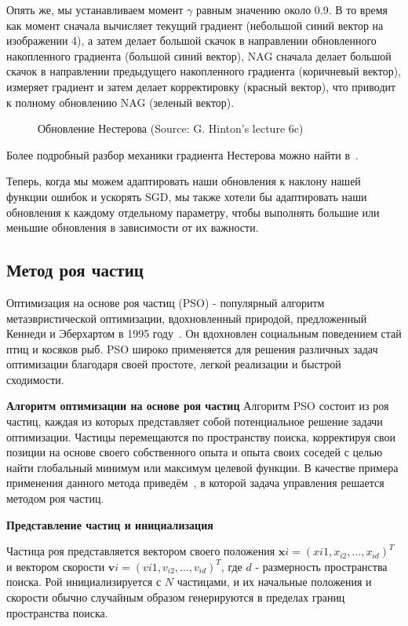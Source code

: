 Опять же, мы устанавливаем момент $\gamma$ равным значению около 0.9.
В то время как момент сначала вычисляет текущий
градиент (небольшой синий вектор на изображении 4),
а затем делает большой скачок в направлении обновленного
накопленного градиента (большой синий вектор), NAG сначала делает
большой скачок в направлении предыдущего накопленного градиента
(коричневый вектор), измеряет градиент и затем делает корректировку
(красный вектор), что приводит к полному обновлению NAG (зеленый вектор).
\begin{figure}[ht]
    \caption{Обновление Нестерова (Source: G. Hinton's lecture 6c)}\label{fig:4_2:1}
\end{figure}

Более подробный разбор механики градиента Нестерова
можно найти в~\cite{Sutskever2013}.

Теперь, когда мы можем адаптировать наши обновления к наклону
нашей функции ошибок и ускорять SGD, мы также хотели бы адаптировать
наши обновления к каждому отдельному параметру, чтобы выполнять
большие или меньшие обновления в зависимости от их важности.

\subsection{Метод роя частиц}\label{subsec:ch4/sec2/stokhastic}
Оптимизация на основе роя частиц (PSO) - популярный алгоритм метаэвристической
оптимизации, вдохновленный природой, предложенный Кеннеди и Эберхартом
в 1995 году~\cite{kennedy1995}.
Он вдохновлен социальным поведением стай птиц и косяков рыб.
PSO широко применяется для решения различных задач оптимизации благодаря
своей простоте, легкой реализации и быстрой сходимости.


\textbf{Алгоритм оптимизации на основе роя частиц}
Алгоритм PSO состоит из роя частиц, каждая из которых представляет собой
потенциальное решение задачи оптимизации.
Частицы перемещаются по пространству поиска, корректируя свои позиции
на основе своего собственного опыта и опыта своих соседей с целью найти
глобальный минимум или максимум целевой функции.
В качестве примера применения данного метода приведём~\cite{Alekseev2019Simulation},
в которой задача управления решается методом роя частиц.

\textbf{Представление частиц и инициализация}

Частица роя представляется вектором своего положения
$\mathbf{x}i = (x{i1}, x_{i2}, \dots, x_{id})^T$ и вектором скорости
$\mathbf{v}i = (v{i1}, v_{i2}, \dots, v_{id})^T$,
где $d$ - размерность пространства поиска.
Рой инициализируется с $N$ частицами, и их начальные положения
и скорости обычно случайным образом генерируются в пределах
границ пространства поиска.

